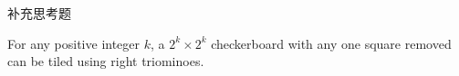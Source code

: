 \begin{frame}{}
  \centerline{\LARGE 补充思考题}
\end{frame}

\begin{frame}{}
  \begin{theorem}
    For any positive integer $k$, 
    a $2^k \times 2^k$ checkerboard with any one square removed 
    can be tiled using right triominoes.
  \end{theorem}

  \vspace{0.30cm}
  \begin{columns}
  \end{columns}
\end{frame}

